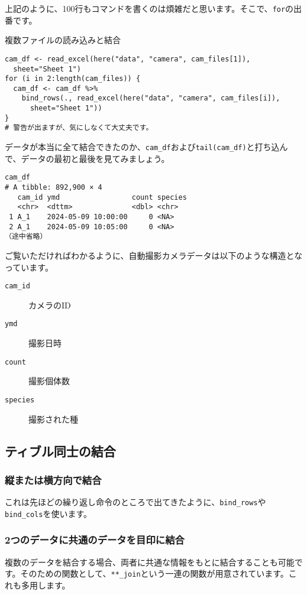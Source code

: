 上記のように、100行もコマンドを書くのは煩雑だと思います。そこで、\verb|for|の出番です。

\begin{itembox}[l]{複数ファイルの読み込みと結合}
\begin{verbatim}
cam_df <- read_excel(here("data", "camera", cam_files[1]),
  sheet="Sheet 1")
for (i in 2:length(cam_files)) {
  cam_df <- cam_df %>%
    bind_rows(., read_excel(here("data", "camera", cam_files[i]),
      sheet="Sheet 1"))
}
# 警告が出ますが、気にしなくて大丈夫です。
\end{verbatim}
\end{itembox}

データが本当に全て結合できたのか、\verb|cam_df|および\verb|tail(cam_df)|と打ち込んで、データの最初と最後を見てみましょう。

\begin{verbatim}
cam_df
# A tibble: 892,900 × 4
   cam_id ymd                 count species
   <chr>  <dttm>              <dbl> <chr>  
 1 A_1    2024-05-09 10:00:00     0 <NA>   
 2 A_1    2024-05-09 10:05:00     0 <NA>   
（途中省略）
\end{verbatim}

ご覧いただければわかるように、自動撮影カメラデータは以下のような構造となっています。
\begin{description}
  \item[\texttt{cam\_id}]カメラのID
  \item[\texttt{ymd}]撮影日時
  \item[\texttt{count}]撮影個体数
  \item[\texttt{species}]撮影された種
\end{description}

  \subsection{ティブル同士の結合}
    \subsubsection{縦または横方向で結合}
これは先ほどの繰り返し命令のところで出てきたように、\verb|bind_rows|や\verb|bind_cols|を使います。

    \subsubsection{2つのデータに共通のデータを目印に結合}
複数のデータを結合する場合、両者に共通な情報をもとに結合することも可能です。そのための関数として、\verb|**_join|という一連の関数が用意されています。これも多用します。

